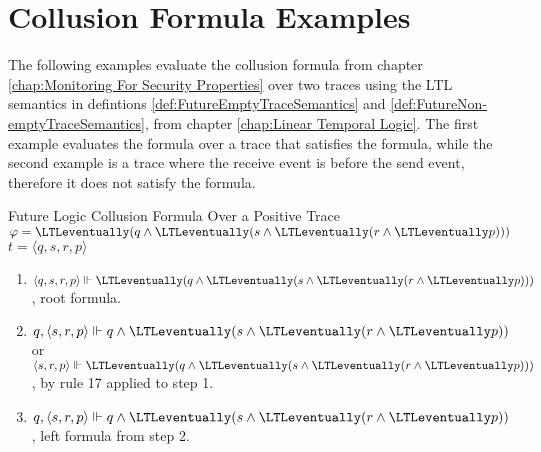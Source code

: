 \chapter{Collusion Formula Examples}
\label{app:CollusionFormulaExamples}

The following examples evaluate the collusion formula from chapter \ref{chap:Monitoring For Security Properties} over two traces using the LTL semantics in defintions \ref{def:FutureEmptyTraceSemantics} and \ref{def:FutureNon-emptyTraceSemantics}, from chapter \ref{chap:Linear Temporal Logic}.  The first example evaluates the formula over a trace that satisfies the formula, while the second example is a trace where the receive event is before the send event, therefore it does not satisfy the formula. 

\begin{myEx} Future Logic Collusion Formula Over a Positive Trace\\

\noindent
$\varphi = \LTLeventually(q \land \LTLeventually(s \land \LTLeventually(r \land \LTLeventually p)))$\\
$t = \langle q, s, r, p \rangle$\\

\begin{enumerate}
\item $\langle q,s,r,p \rangle \Vdash \LTLeventually(q \land \LTLeventually(s \land \LTLeventually(r \land \LTLeventually p)))$, root formula.\\ %

\item $q, \langle s,r,p \rangle \Vdash q \land \LTLeventually(s \land \LTLeventually(r \land \LTLeventually p))$ or $\langle s,r,p \rangle \Vdash \LTLeventually(q \land \LTLeventually(s \land \LTLeventually(r \land \LTLeventually p)))$, by rule 17 applied to step 1.\\ %

\item $q , \langle s,r,p \rangle \Vdash q \land \LTLeventually(s \land \LTLeventually(r \land \LTLeventually p))$, left formula from step 2.\\ %


\end{enumerate}
\end{myEx}
